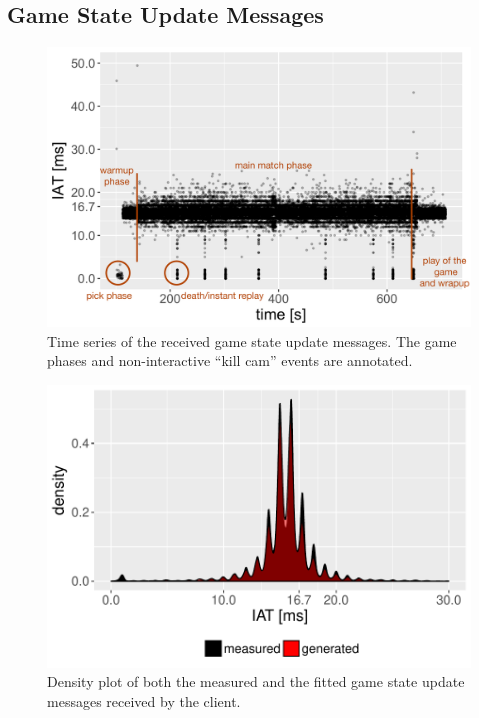 \subsection{Game State Update Messages}

	\begin{figure}[t]
		\centering
		\includegraphics[width=1.0\columnwidth]{images/update-ts-annotated.pdf}
		\caption{Time series of the received game state update messages. The game phases and non-interactive ``kill cam'' events are annotated.}
	\label{fig:update-timeseries}
	\end{figure}

	\begin{figure}[t]
		\centering
		\includegraphics[width=1.0\columnwidth]{images/update-density.pdf}
		\caption{Density plot of both the measured and the fitted game state update messages received by the client.}
	\label{fig:update-density}
	\end{figure}

